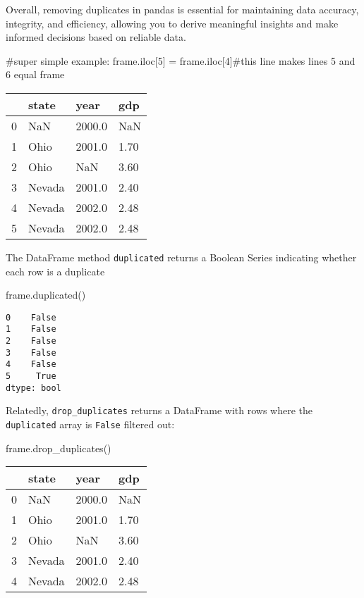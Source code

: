 \documentclass[
  letterpaper,
  DIV=11,
  numbers=noendperiod]{scrreprt}
\newenvironment{Shaded}{\begin{snugshade}}{\end{snugshade}}
\newcommand{\CommentTok}[1]{\textcolor[rgb]{0.37,0.37,0.37}{#1}}
\newcommand{\DecValTok}[1]{\textcolor[rgb]{0.68,0.00,0.00}{#1}}
\newcommand{\NormalTok}[1]{\textcolor[rgb]{0.00,0.23,0.31}{#1}}
\newcommand{\OperatorTok}[1]{\textcolor[rgb]{0.37,0.37,0.37}{#1}}
\begin{document}
Overall, removing duplicates in pandas is essential for maintaining data
accuracy, integrity, and efficiency, allowing you to derive meaningful
insights and make informed decisions based on reliable data.

\begin{Shaded}
\begin{Highlighting}[]
\CommentTok{\#super simple example:}
\NormalTok{frame.iloc[}\DecValTok{5}\NormalTok{] }\OperatorTok{=}\NormalTok{ frame.iloc[}\DecValTok{4}\NormalTok{]}\CommentTok{\#this line makes lines 5 and 6 equal }
\NormalTok{frame}
\end{Highlighting}
\end{Shaded}

\begin{longtable}[]{@{}llll@{}}
\toprule()
& state & year & gdp \\
\midrule()
\endhead
0 & NaN & 2000.0 & NaN \\
1 & Ohio & 2001.0 & 1.70 \\
2 & Ohio & NaN & 3.60 \\
3 & Nevada & 2001.0 & 2.40 \\
4 & Nevada & 2002.0 & 2.48 \\
5 & Nevada & 2002.0 & 2.48 \\
\bottomrule()
\end{longtable}

The DataFrame method \texttt{duplicated} returns a Boolean Series
indicating whether each row is a duplicate

\begin{Shaded}
\begin{Highlighting}[]
\NormalTok{frame.duplicated()}
\end{Highlighting}
\end{Shaded}

\begin{verbatim}
0    False
1    False
2    False
3    False
4    False
5     True
dtype: bool
\end{verbatim}

Relatedly, \texttt{drop\_duplicates} returns a DataFrame with rows where
the \texttt{duplicated} array is \texttt{False} filtered out:

\begin{Shaded}
\begin{Highlighting}[]
\NormalTok{frame.drop\_duplicates()}
\end{Highlighting}
\end{Shaded}

\begin{longtable}[]{@{}llll@{}}
\toprule()
& state & year & gdp \\
\midrule()
\endhead
0 & NaN & 2000.0 & NaN \\
1 & Ohio & 2001.0 & 1.70 \\
2 & Ohio & NaN & 3.60 \\
3 & Nevada & 2001.0 & 2.40 \\
4 & Nevada & 2002.0 & 2.48 \\
\bottomrule()
\end{longtable}
\end{document}
